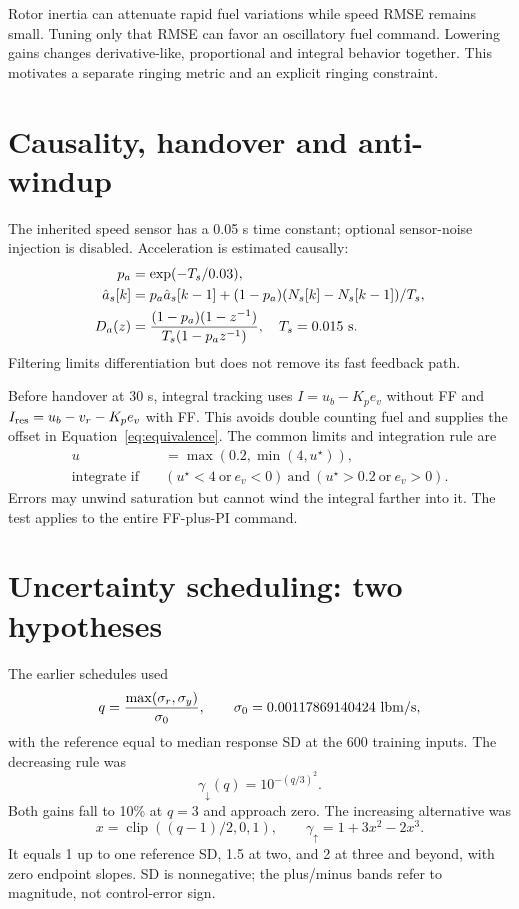Rotor inertia can attenuate rapid fuel variations while speed RMSE remains small. Tuning only that RMSE can favor an oscillatory fuel command. Lowering gains changes derivative-like, proportional and integral behavior together. This motivates a separate ringing metric and an explicit ringing constraint.

\section{Causality, handover and anti-windup}
The inherited speed sensor has a 0.05 s time constant; optional sensor-noise injection is disabled. Acceleration is estimated causally:
\begin{align}
p_a&=\exp(-T_s/0.03),\\
\hat a_s[k]&=p_a\hat a_s[k-1]+(1-p_a)(N_s[k]-N_s[k-1])/T_s,\\
D_a(z)&=\frac{(1-p_a)(1-z^{-1})}{T_s(1-p_az^{-1})},\quad T_s=0.015\ {\rm s}.
\end{align}
Filtering limits differentiation but does not remove its fast feedback path.

Before handover at 30 s, integral tracking uses $I=u_b-K_pe_v$ without FF and $I_{\rm res}=u_b-v_r-K_pe_v$ with FF. This avoids double counting fuel and supplies the offset in Equation~\eqref{eq:equivalence}. The common limits and integration rule are
\begin{align}
u&=\max(0.2,\min(4,u^\star)),\\
\text{integrate if}\quad&
(u^\star<4\ \text{or}\ e_v<0)\ \text{and}\
(u^\star>0.2\ \text{or}\ e_v>0).
\end{align}
Errors may unwind saturation but cannot wind the integral farther into it. The test applies to the entire FF-plus-PI command.

\section{Uncertainty scheduling: two hypotheses}
The earlier schedules used
\begin{equation}
q=\frac{\max(\sigma_r,\sigma_y)}{\sigma_0},\qquad \sigma_0=0.00117869140424\ {\rm lbm/s},
\end{equation}
with the reference equal to median response SD at the 600 training inputs. The decreasing rule was
\begin{equation}\gamma_\downarrow(q)=10^{-(q/3)^2}.\end{equation}
Both gains fall to 10\% at $q=3$ and approach zero. The increasing alternative was
\begin{equation}
x=\operatorname{clip}((q-1)/2,0,1),\qquad \gamma_\uparrow=1+3x^2-2x^3.
\end{equation}
It equals 1 up to one reference SD, 1.5 at two, and 2 at three and beyond, with zero endpoint slopes. SD is nonnegative; the plus/minus bands refer to magnitude, not control-error sign.

